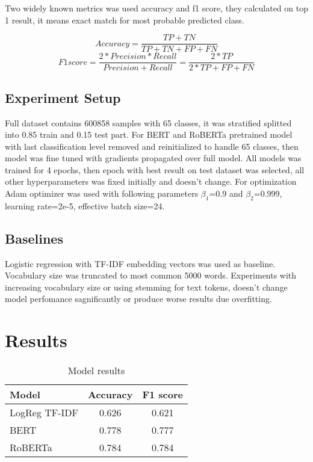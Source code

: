 \documentclass{article}
\begin{document}
Two widely known metrics was used accuracy and f1 score, they calculated on top 1 result, it means exact match for most probable predicted class.

\[
Accuracy = \frac{TP+TN}{TP+TN+FP+FN}
\]
\[
F1 score = \frac{2*Precision*Recall}{Precision+Recall} = \frac{2*TP}{2*TP+FP+FN}
\]

\subsection{Experiment Setup}

Full dataset contains 600858 samples with 65 classes, it was stratified splitted into 0.85 train and 0.15 test part. For BERT and RoBERTa pretrained model with last classification level removed and reinitialized to handle 65 classes, then model was fine tuned with gradients propagated over full model. All models was trained for 4 epochs, then epoch with best result on test dataset was selected, all other hyperparameters was fixed initially and doesn't change. 
For optimization Adam optimizer was used with following parameters $\beta_{1}$=0.9 and $\beta_{2}$=0.999, learning rate=2e-5, effective batch size=24. 


\subsection{Baselines}

Logistic regression with TF-IDF embedding vectors was used as baseline. Vocabulary size was truncated to most common 5000 words. Experiments with increasing vocabulary size or using stemming for text tokens, doesn't change model perfomance sagnificantly or produce worse results due overfitting.

\section{Results}

\begin{table}[!tbh]
    \centering
    \begin{tabular}{|l|c|c|}
\hline
Model & Accuracy & F1 score \\
\hline
LogReg TF-IDF & 0.626 & 0.621 \\
BERT & 0.778 & 0.777 \\
RoBERTa & 0.784 & 0.784 \\
\hline
    \end{tabular}
    \caption{Model results}
    \label{tab:results}
\end{table}
\end{document}
